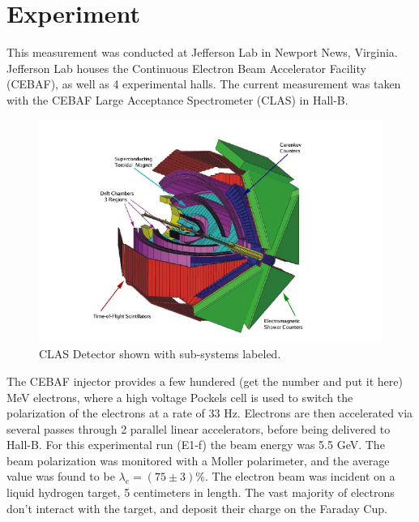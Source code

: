 \section{Experiment}


This measurement was conducted at Jefferson Lab in Newport News, Virginia.  Jefferson Lab houses the Continuous Electron Beam Accelerator Facility (CEBAF), as well as 4 experimental halls.  The current measurement was taken with the CEBAF Large Acceptance Spectrometer (CLAS) in Hall-B.  \\

\begin{figure}
  \label{fig:clas}
  \begin{center}
    \includegraphics[width=\columnwidth]{image/clas.png}
    \caption{CLAS Detector shown with sub-systems labeled.}
  \end{center}
\end{figure}

The CEBAF injector provides a few hundered (get the number and put it here) MeV electrons, where a high voltage Pockels cell is used to switch the polarization of the electrons at a rate of 33 Hz.  Electrons are then accelerated via several passes through 2 parallel linear accelerators, before being delivered to Hall-B.  For this experimental run (E1-f) the beam energy was 5.5 GeV.  The beam polarization was monitored with a Moller polarimeter, and the average value was found to be $\lambda_e= (75 \pm 3) \%$.  The electron beam was incident on a liquid hydrogen target, 5 centimeters in length.  The vast majority of electrons don't interact with the target, and deposit their charge on the Faraday Cup.  \\

